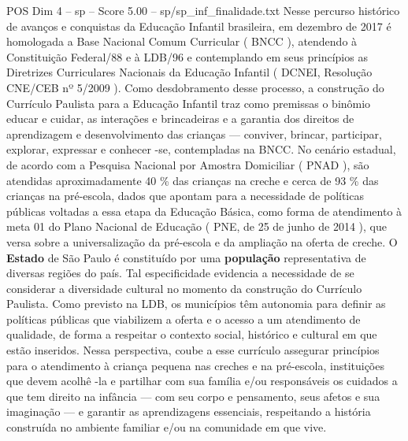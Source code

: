 \begin{textsample}{POS Dim 4 – sp – Score 5.00 – sp/sp\_inf\_finalidade.txt}
Nesse percurso histórico de avanços e conquistas da Educação Infantil brasileira, em dezembro de 2017 é homologada a Base Nacional Comum Curricular ( BNCC ), atendendo à Constituição Federal/88 e à LDB/96 e contemplando em seus princípios as Diretrizes Curriculares Nacionais da Educação Infantil ( DCNEI, Resolução CNE/CEB nº 5/2009 ).
Como desdobramento desse processo, a construção do Currículo Paulista para a Educação Infantil traz como premissas o binômio educar e cuidar, as interações e brincadeiras e a garantia dos direitos de aprendizagem e desenvolvimento das crianças — conviver, brincar, participar, explorar, expressar e conhecer -se, contempladas na BNCC.
No cenário estadual, de acordo com a Pesquisa Nacional por Amostra Domiciliar ( PNAD ), são atendidas aproximadamente 40 \% das crianças na creche e cerca de 93 \% das crianças na pré-escola, dados que apontam para a necessidade de políticas públicas voltadas a essa etapa da Educação Básica, como forma de atendimento à meta 01 do Plano Nacional de Educação ( PNE, de 25 de junho de 2014 ), que versa sobre a universalização da pré-escola e da ampliação na oferta de creche.
O \textbf{Estado} de São Paulo é constituído por uma \textbf{população} representativa de diversas regiões do país.
Tal especificidade evidencia a necessidade de se considerar a diversidade cultural no momento da construção do Currículo Paulista.
Como previsto na LDB, os municípios têm autonomia para definir as políticas públicas que viabilizem a oferta e o acesso a um atendimento de qualidade, de forma a respeitar o contexto social, histórico e cultural em que estão inseridos.
Nessa perspectiva, coube a esse currículo assegurar princípios para o atendimento à criança pequena nas creches e na pré-escola, instituições que devem acolhê -la e partilhar com sua família e/ou responsáveis os cuidados a que tem direito na infância — com seu corpo e pensamento, seus afetos e sua imaginação — e garantir as aprendizagens essenciais, respeitando a história construída no ambiente familiar e/ou na comunidade em que vive.

\end{textsample}
